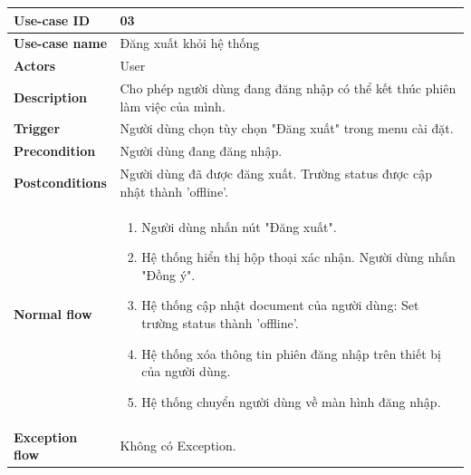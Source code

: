 \documentclass[a4paper, 12pt]{article}
\begin{document}
	\begin{longtable}{|p{3.5cm}|p{12cm}|}
		\hline
		\textbf{Use-case ID} & 03 \\
		\hline
		\textbf{Use-case name} & Đăng xuất khỏi hệ thống \\
		\hline
		\textbf{Actors} & User \\
		\hline
		\textbf{Description} & Cho phép người dùng đang đăng nhập có thể kết thúc phiên làm việc của mình. \\
		\hline
		\textbf{Trigger} & Người dùng chọn tùy chọn "Đăng xuất" trong menu cài đặt. \\
		\hline
		\textbf{Precondition} & Người dùng đang đăng nhập.\\
		\hline
		\textbf{Postconditions} & Người dùng đã được đăng xuất. Trường status được cập nhật thành 'offline'. \\
		\hline
		\textbf{Normal flow} & 
		\begin{enumerate}
			\item Người dùng nhấn nút "Đăng xuất".
			\item Hệ thống hiển thị hộp thoại xác nhận. Người dùng nhấn "Đồng ý".
			\item Hệ thống cập nhật document của người dùng: Set trường status thành 'offline'.
			\item Hệ thống xóa thông tin phiên đăng nhập trên thiết bị của người dùng.
			\item Hệ thống chuyển người dùng về màn hình đăng nhập.
		\end{enumerate} \\
		\hline
		\textbf{Exception flow} & Không có Exception. \\
		\hline
	\end{longtable}
	\vspace{0.5cm}
	
\end{document}
